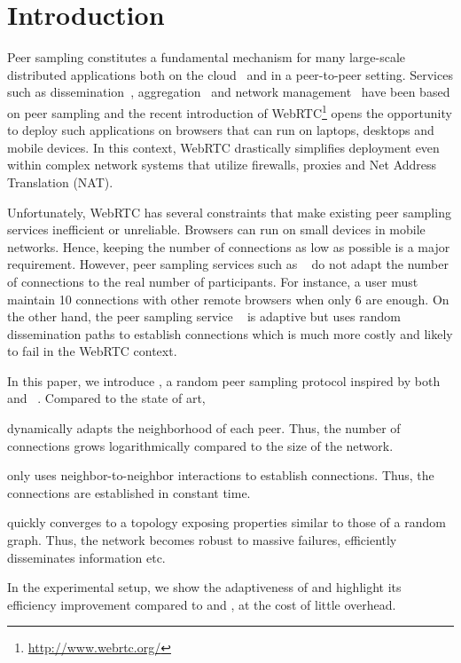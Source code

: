 
\section{Introduction}

Peer sampling constitutes a fundamental mechanism for many large-scale
distributed applications both on the
cloud~\cite{decandia2007dynamo} and in a peer-to-peer
setting. Services such as dissemination~\cite{eugster2003lightweight,
  tolgyeski2009adaptive}, aggregation~\cite{jelasity2004epidemic} and
network management~\cite{jelasity2009tman, voulgaris2005epidemic} have
been based on peer sampling and the recent introduction of
WebRTC\footnote{\url{http://www.webrtc.org/}} opens the opportunity to
deploy such applications on browsers that can run on laptops, desktops
and mobile devices. In this context, WebRTC drastically simplifies
deployment even within complex network systems that utilize firewalls,
proxies and Net Address Translation (NAT).

Unfortunately, WebRTC has several constraints that make existing peer sampling
services inefficient or unreliable. Brow\-sers can run on small devices in
mobile networks. Hence, keeping the number of connections as low as possible is
a major requirement. However, peer sampling services such as
\CYCLON~\cite{voulgaris2005cyclon} do not adapt the number of connections to
the real number of participants. For instance, a user must maintain 10
connections with other remote browsers when only 6 are enough. On the other
hand, the peer sampling service \SCAMP~\cite{ganesh2003peer} is adaptive but
uses random dissemination paths to establish connections which is much more
costly and likely to fail in the WebRTC context.

In this paper, we introduce \SPRAY, a random peer sampling protocol inspired by
both \SCAMP~\cite{ganesh2003peer}
and \CYCLON~\cite{voulgaris2005cyclon}. Compared to the state of art,
\begin{inparaenum}[(i)]
\item \SPRAY dynamically adapts the neighborhood of each peer. Thus, the number
  of connections grows logarithmically compared to the size of the network.
\item \SPRAY only uses neighbor-to-neighbor interactions to establish
  connections. Thus, the connections are established in constant time.
\item \SPRAY quickly converges to a topology exposing properties similar to
  those of a random graph. Thus, the network becomes robust to massive
  failures, efficiently disseminates information etc.
\item In the experimental setup, we show the adaptiveness of \SPRAY and
  highlight its efficiency improvement compared to \CYCLON and \SCAMP, at the
  cost of little overhead.
\end{inparaenum}

